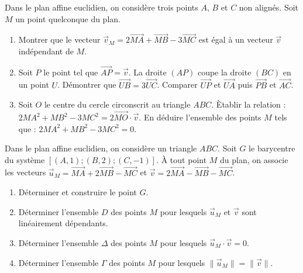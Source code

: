 %
\begin{exo}\label{exo:bary-6}
      Dans le plan affine euclidien, on consid\`ere trois points $A$, $B$ et $C$ non align\'es.
      Soit $M$ un point quelconque du plan.
            \begin{enumerate}
                  \item Montrer que le vecteur $\vec{v}_M = 2 \overrightarrow{MA} + \overrightarrow{MB} - 3 \overrightarrow{MC}$
                        est \'egal \`a un vecteur $\vec{v}$ ind\'ependant de $M$.
                  \item Soit $P$ le point tel que $\overrightarrow{AP} = \vec{v}$.
                        La droite $(AP)$ coupe la droite $(BC)$ en un point $U$.
                        D\'emontrer que $\overrightarrow{UB} = 3 \overrightarrow{UC}$.
                        Comparer $\overrightarrow{UP}$ et $\overrightarrow{UA}$ puis $\overrightarrow{PB}$ et $\overrightarrow{AC}$.
                  \item Soit $O$ le centre du cercle circonscrit au triangle $ABC$.
                        \`Etablir la relation : $2 MA^2 + MB^2 - 3 MC^2 = 2 \overrightarrow{MO} \cdot \vec{v}$.
                        En d\'eduire l'ensemble des points $M$ tels que : $2 MA^2 + MB^2 - 3 MC^2 = 0$.
            \end{enumerate}
\end{exo}
%
\begin{exo}\label{exo:bary-7}
      Dans le plan affine euclidien, on consid\`ere un triangle $ABC$.
      Soit $G$ le barycentre du syst\`eme $[(A,1) ; (B,2) ; (C,-1)]$.
      \`A tout point $M$ du plan, on associe les vecteurs 
            $\vec{u}_{\!\!M} = \overrightarrow{MA} + 2 \overrightarrow{MB} - \overrightarrow{MC}$ et
            $\vec{v} = 2 \overrightarrow{MA} - \overrightarrow{MB} - \overrightarrow{MC}$.
            \begin{enumerate}
                  \item D\'eterminer et construire le point $G$.
                  \item D\'eterminer l'ensemble $D$ des points $M$ pour lesquels 
                        $\vec{u}_M$ et $\vec{v}$ sont lin\'eairement d\'ependants.
                  \item D\'eterminer l'ensemble $\Delta$ des points $M$ pour lesquels $\vec{u}_{\!\!M} \cdot \vec{v} = 0$.
                  \item D\'eterminer l'ensemble $\Gamma$ des points $M$ pour lesquels $\| \vec{u}_{\!\!M} \| = \| \vec{v} \|$.
            \end{enumerate}
\end{exo}

